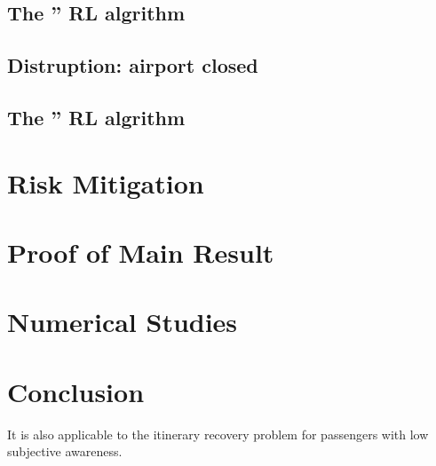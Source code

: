\documentclass[opre,sglanonrev]{informs4}
\begin{document}
\subsection{The '' RL algrithm}

\subsection{Distruption: airport closed}

\subsection{The '' RL algrithm}

\section{Risk Mitigation}

\section{Proof of Main Result}

\section{Numerical Studies}


\section{Conclusion}
It is also applicable to the itinerary recovery problem for passengers with low subjective awareness. 
 


\end{document}
